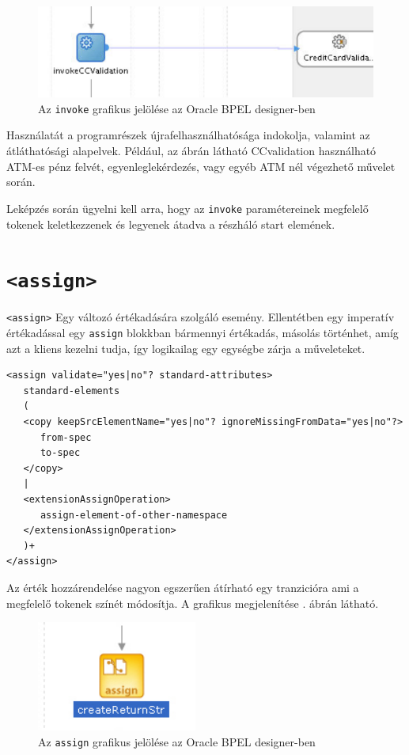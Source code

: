 \begin{figure}[h!]
\centering
\includegraphics[scale=0.6]{images/invoke.png}
\caption{Az \texttt{invoke} grafikus jelölése az Oracle BPEL designer-ben}
\label{fig:invoke}
\end{figure}

Használatát a programrészek újrafelhasználhatósága indokolja, valamint az átláthatósági alapelvek. Például, az ábrán látható CCvalidation használható ATM-es pénz felvét, egyenleglekérdezés, vagy egyéb ATM nél végezhető művelet során. 

Leképzés során ügyelni kell arra, hogy az \texttt{invoke} paramétereinek megfelelő tokenek keletkezzenek és legyenek átadva a részháló start elemének.
\section{\texttt{<assign>}}

\texttt{<assign>} Egy változó értékadására szolgáló esemény. Ellentétben egy imperatív értékadással egy \texttt{assign} blokkban bármennyi értékadás, másolás történhet, amíg azt a kliens kezelni tudja, így logikailag egy egységbe zárja a műveleteket.  
\begin{verbatim}
<assign validate="yes|no"? standard-attributes>
   standard-elements
   (
   <copy keepSrcElementName="yes|no"? ignoreMissingFromData="yes|no"?>
      from-spec
      to-spec
   </copy>
   |
   <extensionAssignOperation>
      assign-element-of-other-namespace
   </extensionAssignOperation>
   )+
</assign>
\end{verbatim}
Az érték hozzárendelése nagyon egszerűen átírható egy tranzicióra ami a megfelelő tokenek színét módosítja. 
A grafikus megjelenítése . ábrán látható.

\begin{figure}[h!]
\centering
\includegraphics[scale=1]{images/assign.png}
\caption{Az \texttt{assign} grafikus jelölése az Oracle BPEL designer-ben}
\label{fig:assign}
\end{figure}

